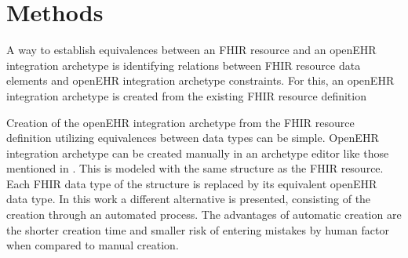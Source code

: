 \section{Methods}

A way to establish equivalences between an FHIR resource and an openEHR integration archetype is identifying relations between FHIR resource data elements and openEHR integration archetype constraints. For this, an openEHR integration archetype is created from the existing FHIR resource definition

Creation of the openEHR integration archetype from the FHIR resource definition utilizing equivalences between data types can be simple. OpenEHR integration archetype can be created manually in an archetype editor like those mentioned in \cite{openEHRModellingTools}. This is modeled with the same structure as the FHIR resource. Each FHIR data type of the structure is replaced by its equivalent openEHR data type. In this work a different alternative is presented, consisting of the creation through an automated process. The advantages of automatic creation are the shorter creation time and smaller risk of entering mistakes by human factor when compared to manual creation.




